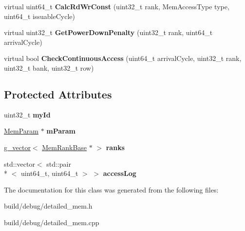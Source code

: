 \begin{DoxyCompactItemize}
\item 
\hypertarget{classMemChannelBase_a9ff5848c466c6796405e3b1f08b7fcc1}{virtual uint64\-\_\-t {\bfseries Calc\-Rd\-Wr\-Const} (uint32\-\_\-t rank, Mem\-Access\-Type type, uint64\-\_\-t issuable\-Cycle)}\label{classMemChannelBase_a9ff5848c466c6796405e3b1f08b7fcc1}

\item 
\hypertarget{classMemChannelBase_a1a39eb438fd4fe5ce42ce05b8f7d9f2d}{virtual uint32\-\_\-t {\bfseries Get\-Power\-Down\-Penalty} (uint32\-\_\-t rank, uint64\-\_\-t arrival\-Cycle)}\label{classMemChannelBase_a1a39eb438fd4fe5ce42ce05b8f7d9f2d}

\item 
\hypertarget{classMemChannelBase_a525de66fc81f4b0d2023d784d9dfdaa8}{virtual bool {\bfseries Check\-Continuous\-Access} (uint64\-\_\-t arrival\-Cycle, uint32\-\_\-t rank, uint32\-\_\-t bank, uint32\-\_\-t row)}\label{classMemChannelBase_a525de66fc81f4b0d2023d784d9dfdaa8}

\end{DoxyCompactItemize}
\subsection*{Protected Attributes}
\begin{DoxyCompactItemize}
\item 
\hypertarget{classMemChannelBase_a7a8fb00f3696fe94d0481cae51ac465d}{uint32\-\_\-t {\bfseries my\-Id}}\label{classMemChannelBase_a7a8fb00f3696fe94d0481cae51ac465d}

\item 
\hypertarget{classMemChannelBase_a731561f7150c1a7e187b0dacb35efedc}{\hyperlink{classMemParam}{Mem\-Param} $\ast$ {\bfseries m\-Param}}\label{classMemChannelBase_a731561f7150c1a7e187b0dacb35efedc}

\item 
\hypertarget{classMemChannelBase_a68b5a238c593be28e3a0fa6a66c2b262}{\hyperlink{classg__vector}{g\-\_\-vector}$<$ \hyperlink{classMemRankBase}{Mem\-Rank\-Base} $\ast$ $>$ {\bfseries ranks}}\label{classMemChannelBase_a68b5a238c593be28e3a0fa6a66c2b262}

\item 
\hypertarget{classMemChannelBase_ac1e5bd9119a1e5d3ace931c9532d1001}{std\-::vector$<$ std\-::pair\\*
$<$ uint64\-\_\-t, uint64\-\_\-t $>$ $>$ {\bfseries access\-Log}}\label{classMemChannelBase_ac1e5bd9119a1e5d3ace931c9532d1001}

\end{DoxyCompactItemize}


The documentation for this class was generated from the following files\-:\begin{DoxyCompactItemize}
\item 
build/debug/detailed\-\_\-mem.\-h\item 
build/debug/detailed\-\_\-mem.\-cpp\end{DoxyCompactItemize}
